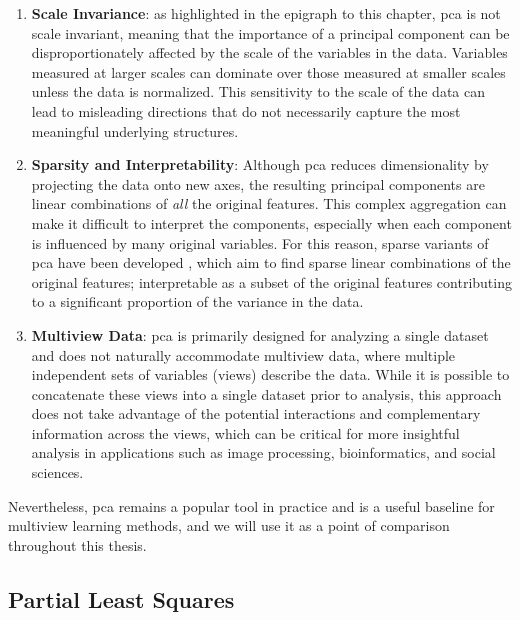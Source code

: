 \begin{enumerate}
    \item \textbf{Scale Invariance}: as highlighted in the epigraph to this chapter, \acrshort{pca} is not scale invariant, meaning that the importance of a principal component can be disproportionately affected by the scale of the variables in the data. Variables measured at larger scales can dominate over those measured at smaller scales unless the data is normalized. This sensitivity to the scale of the data can lead to misleading directions that do not necessarily capture the most meaningful underlying structures.

    \item \textbf{Sparsity and Interpretability}: Although \acrshort{pca} reduces dimensionality by projecting the data onto new axes, the resulting principal components are linear combinations of \textit{all} the original features. This complex aggregation can make it difficult to interpret the components, especially when each component is influenced by many original variables. For this reason, sparse variants of \acrshort{pca} have been developed \citep{zou2006sparse,zou2018selective}, which aim to find sparse linear combinations of the original features; interpretable as a subset of the original features contributing to a significant proportion of the variance in the data.

    \item \textbf{Multiview Data}: \acrshort{pca} is primarily designed for analyzing a single dataset and does not naturally accommodate multiview data, where multiple independent sets of variables (views) describe the data. While it is possible to concatenate these \gls{views} into a single dataset prior to analysis, this approach does not take advantage of the potential interactions and complementary information across the views, which can be critical for more insightful analysis in applications such as image processing, bioinformatics, and social sciences.
\end{enumerate}

Nevertheless, \acrshort{pca} remains a popular tool in practice \citep{greenacre2022principal} and is a useful baseline for multiview learning methods, and we will use it as a point of comparison throughout this thesis.

\subsection{Partial Least Squares}

